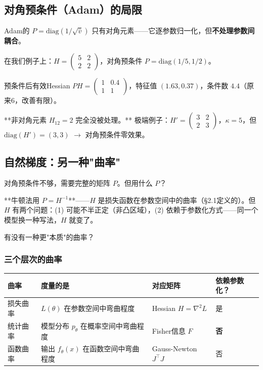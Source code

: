 \documentclass[12pt,a4paper]{article}
\begin{document}
\subsection{对角预条件（Adam）的局限}

Adam的 $P = \text{diag}(1/\sqrt{\hat{v}})$ 只有对角元素——它逐参数归一化，但\textbf{不处理参数间耦合}。

在我们例子上：$H = \begin{pmatrix}5&2\\2&2\end{pmatrix}$，对角预条件 $P = \text{diag}(1/5, 1/2)$。

预条件后有效Hessian $PH = \begin{pmatrix}1&0.4\\1&1\end{pmatrix}$，特征值 $(1.63, 0.37)$，条件数 $4.4$（原来6，改善有限）。

**非对角元素 $H_{12} = 2$ 完全没被处理。** 极端例子：$H' = \begin{pmatrix}3&2\\2&3\end{pmatrix}$，$\kappa = 5$，但 $\text{diag}(H') = (3,3)$ $\to$ 对角预条件零效果。


\subsection{自然梯度：另一种"曲率"}

对角预条件不够，需要完整的矩阵 $P$。但用什么 $P$？

**牛顿法用 $P = H^{-1}$**——$H$ 是损失函数在参数空间中的曲率（§2.1定义的）。但 $H$ 有两个问题：(1) 可能不半正定（非凸区域），(2) 依赖于参数化方式——同一个模型换一种写法，$H$ 就变了。

有没有一种更"本质"的曲率？


\subsubsection{三个层次的曲率}






\begin{center}\small
\begin{longtable}{|l|l|l|l|}
\hline
曲率 & 度量的是 & 对应矩阵 & 依赖参数化？ \\
\hline
损失曲率 & $L(\theta)$ 在参数空间中弯曲程度 & Hessian $H = \nabla^2 L$ & 是 \\
统计曲率 & 模型分布 $p_\theta$ 在概率空间中弯曲程度 & Fisher信息 $F$ & \textbf{否} \\
函数曲率 & 输出 $f_\theta(x)$ 在函数空间中弯曲程度 & Gauss-Newton $J^\top J$ & 否 \\
\hline
\end{longtable}
\end{center}
\end{document}
